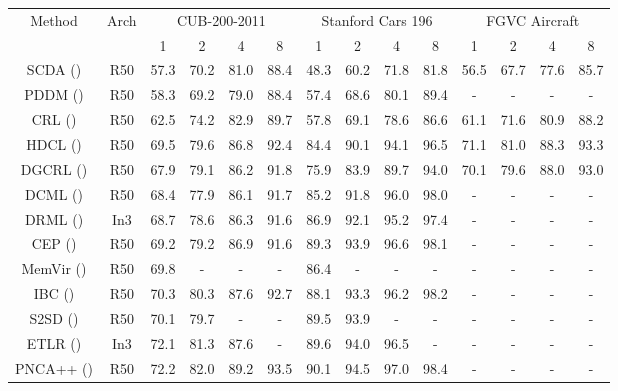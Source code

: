 \documentclass[letterpaper]{article} %
\begin{document}
\begin{table}\centering

	\begin{tabular}{c|c||cccc|cccc|cccc}
		\hline
		\hline
       \multirow{2.5}{*}{Method} & \multirow{2.5}{*}{Arch}& \multicolumn{4}{|c|}{CUB-200-2011}&  \multicolumn{4}{c|}{Stanford Cars 196} & \multicolumn{4}{c}{FGVC Aircraft}\\
		\cline{3-14}
		&  & 1&2&4&8& 1&2&4&8& 1&2&4&8 \\
		\hline
		\hline
		SCDA (\citeauthor{DBLP:journals/tip/WeiLWZ17})& R50& 57.3 & 70.2 & 81.0 &88.4& 48.3& 60.2&71.8&81.8& 56.5& 67.7&77.6&85.7\\
PDDM (\citeauthor{DBLP:journals/tog/Bala15})& R50& 58.3&69.2&79.0&88.4&57.4&68.6&80.1&89.4&-&-&-&-\\

CRL (\citeauthor{DBLP:conf/ijcai/ZhengJSWHY18}) & R50& 62.5 & 74.2 & 82.9 &89.7& 57.8& 69.1&78.6&86.6& 61.1& 71.6&80.9&88.2\\
HDCL (\citeauthor{DBLP:journals/ijon/ZengLWZCL21}) & R50& 69.5 & 79.6 & 86.8 &92.4& 84.4& 90.1&94.1&96.5& 71.1& 81.0&88.3&93.3\\
\hline
\hline
		DGCRL (\citeauthor{DBLP:conf/aaai/ZhengJSZWH19})& R50& 67.9 & 79.1 & 86.2 &91.8& 75.9& 83.9&89.7&94.0& 70.1& 79.6&88.0&93.0\\
		DCML (\citeauthor{DBLP:conf/cvpr/ZhengWL021}) & R50& 68.4 & 77.9 & 86.1 &91.7& 85.2& 91.8&96.0&98.0&-& -& -&-\\
		DRML (\citeauthor{DBLP:conf/iccv/ZhengZL021}) & In3 & 68.7 & 78.6 & 86.3 & 91.6 & 86.9 & 92.1& 95.2& 97.4 & -& -& -&-\\
		CEP (\citeauthor{DBLP:conf/eccv/BoudiafRZGPPA20})& R50&69.2 & 79.2 & 86.9 &91.6& 89.3& 93.9&96.6&98.1&  -& -& -&-\\
		MemVir (\citeauthor{DBLP:conf/iccv/KoGK21}) & R50 & 69.8&-&-&-& 86.4&-&-&-&- &- &- &-\\
	    IBC (\citeauthor{DBLP:conf/icml/SeidenschwarzEL21}) & R50 & 70.3 & 80.3& 87.6& 92.7& 88.1& 93.3& 96.2& 98.2& - &- &- &- \\
		S2SD (\citeauthor{DBLP:conf/icml/RothMOCG21})& R50& 70.1 & 79.7& -&-&89.5& 93.9&-&-&- &- &- &-\\
		ETLR (\citeauthor{DBLP:conf/cvpr/KimKCK21})& In3& 72.1 & 81.3 & 87.6 &-& 89.6& 94.0&96.5&-&-& -& -&- \\
		PNCA++ (\citeauthor{DBLP:conf/eccv/TehDT20})& R50& 72.2 & 82.0 & 89.2 &93.5& 90.1& 94.5&97.0&98.4&-& -& -&-\\
\hline
\hline



\end{tabular}
\end{table}
\end{document}
